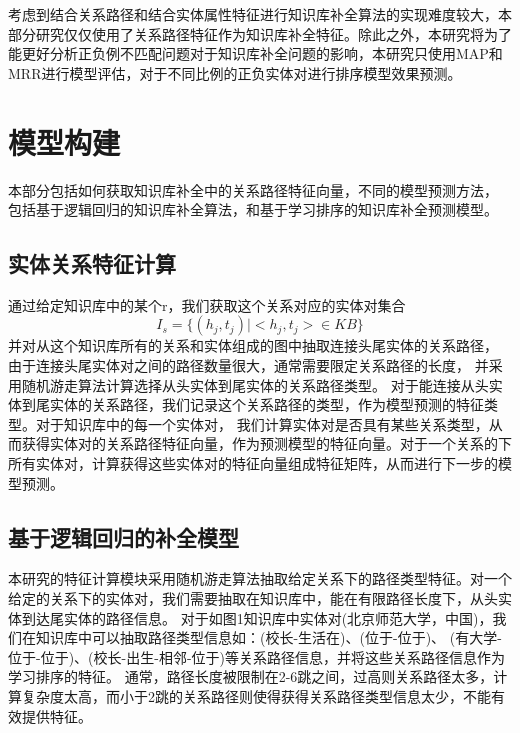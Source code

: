 考虑到结合关系路径和结合实体属性特征进行知识库补全算法的实现难度较大，本部分研究仅仅使用了关系路径特征作为知识库补全特征。除此之外，本研究将为了能更好分析正负例不匹配问题对于知识库补全问题的影响，本研究只使用MAP和MRR进行模型评估，对于不同比例的正负实体对进行排序模型效果预测。

\section{模型构建}
本部分包括如何获取知识库补全中的关系路径特征向量，不同的模型预测方法，
包括基于逻辑回归的知识库补全算法，和基于学习排序的知识库补全预测模型。

\subsection{实体关系特征计算}
通过给定知识库中的某个r，我们获取这个关系对应的实体对集合
$$I_s=\{(h_j,t_j)|<h_j,t_j> \in KB\}$$
并对从这个知识库所有的关系和实体组成的图中抽取连接头尾实体的关系路径，
由于连接头尾实体对之间的路径数量很大，通常需要限定关系路径的长度，
并采用随机游走算法计算选择从头实体到尾实体的关系路径类型。
对于能连接从头实体到尾实体的关系路径，我们记录这个关系路径的类型，作为模型预测的特征类型。对于知识库中的每一个实体对，
我们计算实体对是否具有某些关系类型，从而获得实体对的关系路径特征向量，作为预测模型的特征向量。对于一个关系的下所有实体对，计算获得这些实体对的特征向量组成特征矩阵，从而进行下一步的模型预测。

\subsection{基于逻辑回归的补全模型}

本研究的特征计算模块采用随机游走算法抽取给定关系下的路径类型特征。对一个给定的关系下的实体对，我们需要抽取在知识库中，能在有限路径长度下，从头实体到达尾实体的路径信息。
对于如图1知识库中实体对(北京师范大学，中国)，我们在知识库中可以抽取路径类型信息如：(校长-生活在)、(位于-位于)、
(有大学-位于-位于)、(校长-出生-相邻-位于)等关系路径信息，并将这些关系路径信息作为学习排序的特征。
通常，路径长度被限制在2-6跳之间，过高则关系路径太多，计算复杂度太高，而小于2跳的关系路径则使得获得关系路径类型信息太少，不能有效提供特征。

